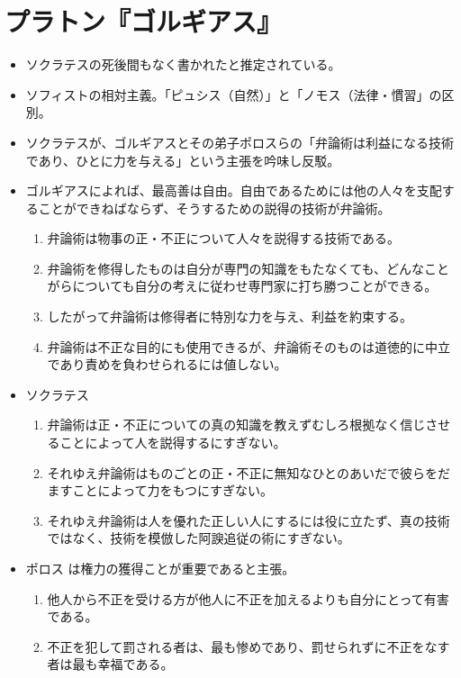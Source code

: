 \documentclass[uplatex]{bxjsarticle}
\begin{document}
\section{プラトン『ゴルギアス』}
\begin{itemize}
\item ソクラテスの死後間もなく書かれたと推定されている。

\item ソフィストの相対主義。「ピュシス（自然）」と「ノモス（法律・慣習」の区別。

\item ソクラテスが、ゴルギアスとその弟子ポロスらの「弁論術は利益になる技術であり、ひとに力を与える」という主張を吟味し反駁。

\item ゴルギアスによれば、最高善は自由。自由であるためには他の人々を支配することができねばならず、そうするための説得の技術が弁論術。

  \begin{enumerate}
  \item 弁論術は物事の正・不正について人々を説得する技術である。
  \item 弁論術を修得したものは自分が専門の知識をもたなくても、どんなことがらについても自分の考えに従わせ専門家に打ち勝つことができる。
  \item したがって弁論術は修得者に特別な力を与え、利益を約束する。
  \item 弁論術は不正な目的にも使用できるが、弁論術そのものは道徳的に中立であり責めを負わせられるには値しない。
  \end{enumerate}


\item ソクラテス
  \begin{enumerate}
  \item 弁論術は正・不正についての真の知識を教えずむしろ根拠なく信じさせることによって人を説得するにすぎない。
  \item それゆえ弁論術はものごとの正・不正に無知なひとのあいだで彼らをだますことによって力をもつにすぎない。
  \item それゆえ弁論術は人を優れた正しい人にするには役に立たず、真の技術ではなく、技術を模倣した阿諛追従の術にすぎない。
  \end{enumerate}

\item ポロス
  は権力の獲得ことが重要であると主張。

   \begin{enumerate}
   \item 他人から不正を受ける方が他人に不正を加えるよりも自分にとって有害である。
   \item 不正を犯して罰される者は、最も惨めであり、罰せられずに不正をなす者は最も幸福である。
   \end{enumerate}


\end{itemize}
\end{document}
